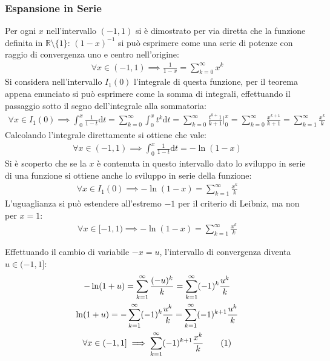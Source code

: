 \documentclass{article}
\numberwithin{equation}{subsection}
\newcommand{\tageq}{\tag{\stepcounter{equation}\theequation}}
\begin{document}
\subsubsection{Espansione in Serie}

Per ogni $x$ nell'intervallo $(-1,1)$ si è dimostrato per via diretta che la funzione definita in $\mathbb{R}\setminus\{1\}$: $(1-x)^{-1}$ si può esprimere come una serie di potenze con raggio di convergenza uno e centro nell'origine:
\begin{gather}
    \forall x\in(-1,1)\implies\displaystyle\frac{1}{1-x}=\sum_{k=0}^\infty x^k
\end{gather}
Si considera nell'intervallo $I_1(0)$ l'integrale di questa funzione, per il teorema appena enunciato si può esprimere come la somma di integrali, effettuando il passaggio sotto il segno dell'integrale alla sommatoria: %
\begin{gather*}
    \forall x \in I_1(0)\implies\displaystyle\int_{0}^x\frac{1}{1-t}\mathrm{d}t=
    \sum_{k=0}^\infty\int_{0}^x t^k\mathrm{d}t=
    \sum_{k=0}^\infty\frac{t^{k+}1}{k+1}\bigg|_{0}^x=
    \sum_{k=0}^\infty\frac{x^{k+1}}{k+1}=\sum_{k=1}^\infty\frac{x^k}{k}
\end{gather*}
Calcolando l'integrale direttamente si ottiene che vale:
\begin{gather*}
    \forall x\in(-1,1)\implies\displaystyle\int_0^x\frac{1}{1-t}\mathrm{d}t=-\ln(1-x)
\end{gather*}
Si è scoperto che se la $x$ è contenuta in questo intervallo dato lo sviluppo in serie di una funzione si ottiene anche lo sviluppo in serie della funzione:
\begin{gather*}
    \forall x\in I_1(0)\implies -\ln(1-x)=\displaystyle\sum_{k=1}^\infty\frac{x^k}{k}
\end{gather*}
L'uguaglianza si può estendere all'estremo $-1$ per il criterio di Leibniz, ma non per $x=1$:
\begin{gather}
    \forall x\in [-1,1)\implies -\ln(1-x)=\displaystyle\sum_{k=1}^\infty\frac{x^k}{k}
\end{gather}

Effettuando il cambio di variabile $-x=u$, l'intervallo di convergenza diventa $u\in(-1, 1]$:
\begin{gather*}
    -\ln(1+u)=\displaystyle\sum_{k=1}^\infty\frac{(-u)^k}{k}=
    \displaystyle\sum_{k=1}^\infty(-1)^k\frac{u^k}{k}\\
    \ln(1+u)=-\displaystyle\sum_{k=1}^\infty(-1)^k\frac{u^k}{k}=
    \displaystyle\sum_{k=1}^\infty(-1)^{k+1}\frac{u^k}{k}\\
    \forall x\in(-1,1]\implies\displaystyle\sum_{k=1}^\infty(-1)^{k+1}\frac{x^k}{k}\tageq
\end{gather*}
\end{document}
